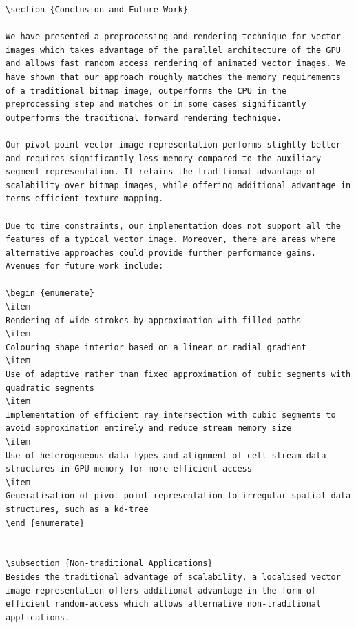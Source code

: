 \documentclass[11pt,a4paper,twoside]{article}
\begin{document}
\begin {verbatim}
\section {Conclusion and Future Work}

We have presented a preprocessing and rendering technique for vector images which takes advantage of the parallel architecture of the GPU and allows fast random access rendering of animated vector images. We have shown that our approach roughly matches the memory requirements of a traditional bitmap image, outperforms the CPU in the preprocessing step and matches or in some cases significantly outperforms the traditional forward rendering technique.

Our pivot-point vector image representation performs slightly better and requires significantly less memory compared to the auxiliary-segment representation. It retains the traditional advantage of scalability over bitmap images, while offering additional advantage in terms efficient texture mapping.

Due to time constraints, our implementation does not support all the features of a typical vector image. Moreover, there are areas where alternative approaches could provide further performance gains. Avenues for future work include:

\begin {enumerate}
\item
Rendering of wide strokes by approximation with filled paths
\item
Colouring shape interior based on a linear or radial gradient
\item
Use of adaptive rather than fixed approximation of cubic segments with quadratic segments
\item
Implementation of efficient ray intersection with cubic segments to avoid approximation entirely and reduce stream memory size
\item
Use of heterogeneous data types and alignment of cell stream data structures in GPU memory for more efficient access
\item
Generalisation of pivot-point representation to irregular spatial data structures, such as a kd-tree
\end {enumerate}


\subsection {Non-traditional Applications}
Besides the traditional advantage of scalability, a localised vector image representation offers additional advantage in the form of efficient random-access which allows alternative non-traditional applications.


\end{verbatim}
\end{document}
